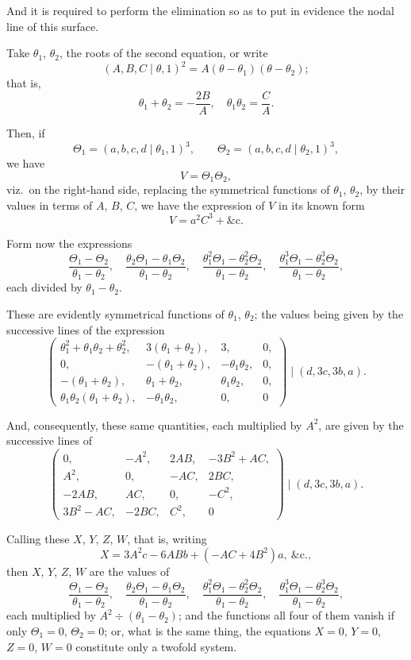 \documentclass[12pt,a4paper]{article}
\theoremstyle{plain}
\begin{document}
And it is required to perform the elimination so as to put in evidence
the nodal line of this surface.

Take $\theta_1$, $\theta_2$, the roots of the second equation, or write
\[
(A,B,C\mid\theta,1)^2 = A(\theta-\theta_1)(\theta-\theta_2);
\]
that is,
\[
\theta_1+\theta_2 = -\frac{2B}{A},\quad \theta_1\theta_2 = \frac{C}{A}.
\]

Then, if
\[
\Theta_1 = (a,b,c,d\mid\theta_1,1)^3,\qquad
\Theta_2 = (a,b,c,d\mid\theta_2,1)^3,
\]
we have
\[
V = \Theta_1\Theta_2,
\]
viz.~on the right-hand side, replacing the symmetrical functions of
$\theta_1$, $\theta_2$, by their values in terms of $A$, $B$, $C$, we have the
expression of $V$ in its known form
\[
V = a^2C^3 + \&\text{c.}
\]

Form now the expressions
\[
\frac{\Theta_1-\Theta_2}{\theta_1-\theta_2},\quad
\frac{\theta_2\Theta_1-\theta_1\Theta_2}{\theta_1-\theta_2},\quad
\frac{\theta_1^2\Theta_1-\theta_2^2\Theta_2}{\theta_1-\theta_2},\quad
\frac{\theta_1^3\Theta_1-\theta_2^3\Theta_2}{\theta_1-\theta_2},
\]
each divided by $\theta_1-\theta_2$.

These are evidently symmetrical functions of $\theta_1$, $\theta_2$; the values
being given by the successive lines of the expression
\[
\begin{pmatrix}
\theta_1^2+\theta_1\theta_2+\theta_2^2, & 3(\theta_1+\theta_2), & 3, & 0,\\
0, & -(\theta_1+\theta_2), & -\theta_1\theta_2, & 0,\\
-(\theta_1+\theta_2), & \theta_1+\theta_2, & \theta_1\theta_2, & 0,\\
\theta_1\theta_2(\theta_1+\theta_2), & -\theta_1\theta_2, & 0, & 0
\end{pmatrix}
\mid
(d, 3c, 3b, a).
\]

And, consequently, these same quantities, each multiplied by $A^2$, are
given by the successive lines of
\[
\begin{pmatrix}
0, & -A^2, & 2AB, & -3B^2+AC,\\
A^2, & 0, & -AC, & 2BC,\\
-2AB, & AC, & 0, & -C^2,\\
3B^2-AC, & -2BC, & C^2, & 0
\end{pmatrix}
\mid
(d, 3c, 3b, a).
\]

Calling these $X$, $Y$, $Z$, $W$, that is, writing
\[
X = 3A^2c - 6ABb + (-AC + 4B^2)a,\ \&\text{c.},
\]
then $X$, $Y$, $Z$, $W$ are the values of
\[
\frac{\Theta_1-\Theta_2}{\theta_1-\theta_2},\quad
\frac{\theta_2\Theta_1-\theta_1\Theta_2}{\theta_1-\theta_2},\quad
\frac{\theta_1^2\Theta_1-\theta_2^2\Theta_2}{\theta_1-\theta_2},\quad
\frac{\theta_1^3\Theta_1-\theta_2^3\Theta_2}{\theta_1-\theta_2},
\]
each multiplied by $A^2\div(\theta_1-\theta_2)$; and the functions all four of them
vanish if only $\Theta_1=0$, $\Theta_2=0$; or, what is the same thing, the
equations $X=0$, $Y=0$, $Z=0$, $W=0$ constitute only a twofold system.
\end{document}
